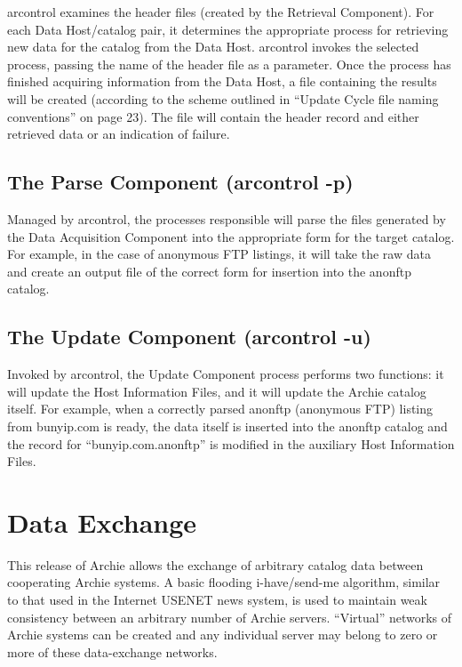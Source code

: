 arcontrol examines the header files (created by the Retrieval Component). For
each Data Host/catalog pair, it determines the appropriate process for
retrieving new data for the catalog from the Data Host. arcontrol invokes the
selected process, passing the name of the header file as a parameter. Once the
process has finished acquiring information from the Data Host, a file
containing the results will be created (according to the scheme outlined in
``Update Cycle file naming conventions'' on page 23). The file will contain the
header record and either retrieved data or an indication of failure.

\subsection{The Parse Component (arcontrol -p)}

Managed by arcontrol, the processes responsible will parse the files generated
by the Data Acquisition Component into the appropriate form for the target
catalog. For example, in the case of anonymous FTP listings, it will take the
raw data and create an output file of the correct form for insertion into the
anonftp catalog.

\subsection{The Update Component (arcontrol -u)}

Invoked by arcontrol, the Update Component process performs two functions: it
will update the Host Information Files, and it will update the Archie catalog
itself. For example, when a correctly parsed anonftp (anonymous FTP) listing
from bunyip.com is ready, the data itself is inserted into the anonftp catalog
and the record for ``bunyip.com.anonftp'' is modified in the auxiliary Host
Information Files.


\section{Data Exchange}

This release of Archie allows the exchange of arbitrary catalog data between
cooperating Archie systems. A basic flooding i-have/send-me algorithm, similar
to that used in the Internet USENET news system, is used to maintain weak
consistency between an arbitrary number of Archie servers. ``Virtual'' networks
of Archie systems can be created and any individual server may belong to zero
or more of these data-exchange networks.

